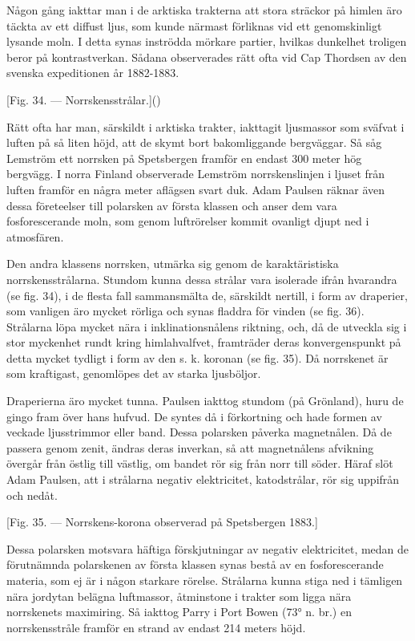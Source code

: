 \documentclass[a4paper, 12pt, oneside, swedish]{article}
\begin{document}
Någon gång iakttar man i de arktiska trakterna att stora sträckor på himlen äro täckta av ett diffust ljus, som kunde närmast förliknas vid ett genomskinligt lysande moln. I detta synas inströdda mörkare partier, hvilkas dunkelhet troligen beror på kontrastverkan. Sådana observerades rätt ofta vid Cap Thordsen av den svenska expeditionen år 1882-1883.

[Fig. 34. --- Norrskensstrålar.]()

Rätt ofta har man, särskildt i arktiska trakter, iakttagit ljusmassor som sväfvat i luften på så liten höjd, att de skymt bort bakomliggande bergväggar. Så såg Lemström ett norrsken på Spetsbergen framför en endast 300 meter hög bergvägg. I norra Finland observerade Lemström norrskenslinjen i ljuset från luften framför en några meter aflägsen svart duk. Adam Paulsen räknar även dessa företeelser till polarsken av första klassen och anser dem vara fosforescerande moln, som genom luftrörelser kommit ovanligt djupt ned i atmosfären.

Den andra klassens norrsken, utmärka sig genom de karaktäristiska norrskensstrålarna. Stundom kunna dessa strålar vara isolerade ifrån hvarandra (se fig. 34), i de flesta fall sammansmälta de, särskildt nertill, i form av draperier, som vanligen äro mycket rörliga och synas fladdra för vinden (se fig. 36). Strålarna löpa mycket nära i inklinationsnålens riktning, och, då de utveckla sig i stor myckenhet rundt kring himlahvalfvet, framträder deras konvergenspunkt på detta mycket tydligt i form av den s. k. koronan (se fig. 35). Då norrskenet är som kraftigast, genomlöpes det av starka ljusböljor.

Draperierna äro mycket tunna. Paulsen iakttog stundom (på Grönland), huru de gingo fram över hans hufvud. De syntes då i förkortning och hade formen av veckade ljusstrimmor eller band. Dessa polarsken påverka magnetnålen. Då de passera genom zenit, ändras deras inverkan, så att magnetnålens afvikning övergår från östlig till västlig, om bandet rör sig från norr till söder. Häraf slöt Adam Paulsen, att i strålarna negativ elektricitet, katodstrålar, rör sig uppifrån och nedåt.

[Fig. 35. --- Norrskens-korona observerad på Spetsbergen 1883.]

Dessa polarsken motsvara häftiga förskjutningar av negativ elektricitet, medan de förutnämnda polarskenen av första klassen synas bestå av en fosforescerande materia, som ej är i någon starkare rörelse. Strålarna kunna stiga ned i tämligen nära jordytan belägna luftmassor, åtminstone i trakter som ligga nära norrskenets maximiring. Så iakttog Parry i Port Bowen (73° n. br.) en norrskensstråle framför en strand av endast 214 meters höjd.
\end{document}
